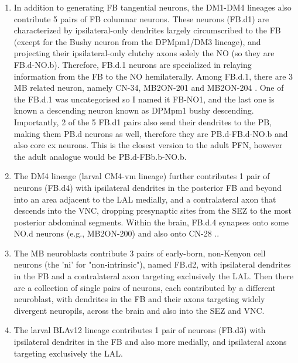             \begin{enumerate}
                \item In addition to generating FB tangential neurons, the DM1-DM4 lineages also contribute 5 pairs of FB columnar neurons. These neurons (FB.d1) are characterized by ipsilateral-only dendrites largely circumscribed to the FB (except for the Bushy neuron from the DPMpm1/DM3 lineage), and projecting their ipsilateral-only clutchy axons solely the NO (so they are FB.d-NO.b). Therefore, FB.d.1 neurons are specialized in relaying information from the FB to the NO hemilaterally. Among FB.d.1, there are 3 MB related neuron, namely CN-34, MB2ON-201 and MB2ON-204  \citep{eschbach2021circuits}. One of the FB.d.1 was uncategorised so I named it FB-NO1, and the last one is known a descending neuron known as DPMpm1 bushy descending. 
                Importantly, 2 of the 5 FB.d1 pairs also send their dendrites to the PB, making them PB.d neurons as well, therefore they are PB.d-FB.d-NO.b and also core cx neurons. This is the closest version to the adult PFN, however the adult analogue would be PB.d-FBb.b-NO.b. %

                \item The DM4 lineage (larval CM4-vm lineage) further contributes 1 pair of neurons (FB.d4) with ipsilateral dendrites in the posterior FB and beyond into an area adjacent to the LAL medially, and a contralateral axon that descends into the VNC, dropping presynaptic sites from the SEZ to the most posterior abdominal segments. Within the brain, FB.d.4 synapses onto some NO.d neurons (e.g., MB2ON-200) and also onto CN-28 \citep{eschbach2021circuits}..

                \item The MB neuroblasts contribute 3 pairs of early-born, non-Kenyon cell neurons (the 'ni' for "non-intrinsic"), named FB.d2, with ipsilateral dendrites in the FB and a contralateral axon targeting exclusively the LAL.
                Then there are a collection of single pairs of neurons, each contributed by a different neuroblast, with dendrites in the FB and their axons targeting widely divergent neuropils, across the brain and also into the SEZ and VNC.

                \item The larval BLAv12 lineage contributes 1 pair of neurons (FB.d3) with ipsilateral dendrites in the FB and also more medially, and ipsilateral axons targeting exclusively the LAL.


\end{enumerate}
